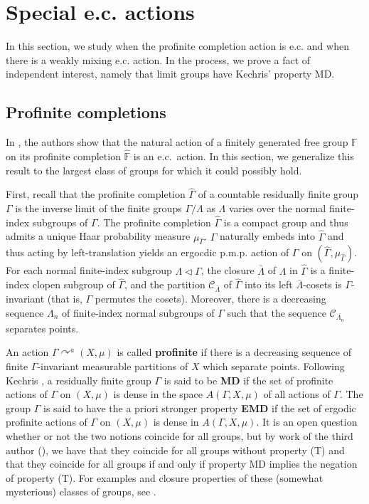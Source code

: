 \documentclass[12pt]{amsart}
\theoremstyle{definition}
\def\bb{\mathbb}
\def\bb{\mathbb}
\def\cal{\mathcal}
\newcommand{\acts}{\curvearrowright}
\begin{document}
\section{Special e.c. actions}\label{special}

In this section, we study when the profinite completion action is e.c. and when there is a weakly mixing e.c. action.  In the process, we prove a fact of independent interest, namely that limit groups have Kechris' property MD.

\subsection{Profinite completions}\label{profinitesub}
In \cite{BIH}, the authors show that the natural action of a finitely generated free group $\bb F$ on its profinite completion $\hat {\bb F}$ is an e.c.\ action.  In this section, we generalize this result to the largest class of groups for which it could possibly hold.

First, recall that the profinite completion $\hat{\Gamma}$ of a countable residually finite group $\Gamma$ is the inverse limit of the finite groups $\Gamma / \Lambda$ as $\Lambda$ varies over the normal finite-index subgroups of $\Gamma$. The profinite completion $\hat{\Gamma}$ is a compact group and thus admits a unique Haar probability measure $\mu_{\hat \Gamma}$. $\Gamma$ naturally embeds into $\hat{\Gamma}$ and thus acting by left-translation yields an ergocdic p.m.p. action of $\Gamma$ on $(\hat{\Gamma}, \mu_{\hat \Gamma})$. For each normal finite-index subgroup $\Lambda \lhd \Gamma$, the closure $\bar{\Lambda}$ of $\Lambda$ in $\hat{\Gamma}$ is a finite-index clopen subgroup of $\hat{\Gamma}$, and the partition $\cal C_{\bar{\Lambda}}$ of $\hat{\Gamma}$ into its left $\bar{\Lambda}$-cosets is $\Gamma$-invariant (that is, $\Gamma$ permutes the cosets). Moreover, there is a decreasing sequence $\Lambda_n$ of finite-index normal subgroups of $\Gamma$ such that the sequence $\cal C_{\bar{\Lambda_n}}$ separates points.

An action $\Gamma\acts^a (X,\mu)$ is called \textbf{profinite} if there is a decreasing sequence of finite $\Gamma$-invariant measurable partitions of $X$ which separate points.  Following Kechris \cite{kechrisweak}, a residually finite group $\Gamma$ is said to be \textbf{MD} if the set of profinite actions of $\Gamma$ on $(X,\mu)$ is dense in the space $A(\Gamma,X,\mu)$ of all actions of $\Gamma$.  The group $\Gamma$ is said to have the a priori stronger property \textbf{EMD} if the set of ergodic profinite actions of $\Gamma$ on $(X,\mu)$ is dense in $A(\Gamma,X,\mu)$.  It is an open question whether or not the two notions coincide for all groups, but by work of the third author (\cite[Corollary 4.7 and Theorem 4.10]{TD}), we have that they coincide for all groups without property (T) and that they coincide for all groups if and only if property MD implies the negation of property (T).  For examples and closure properties of these (somewhat mysterious) classes of groups, see \cite[Section 5]{kechrisburton}.
\end{document}
